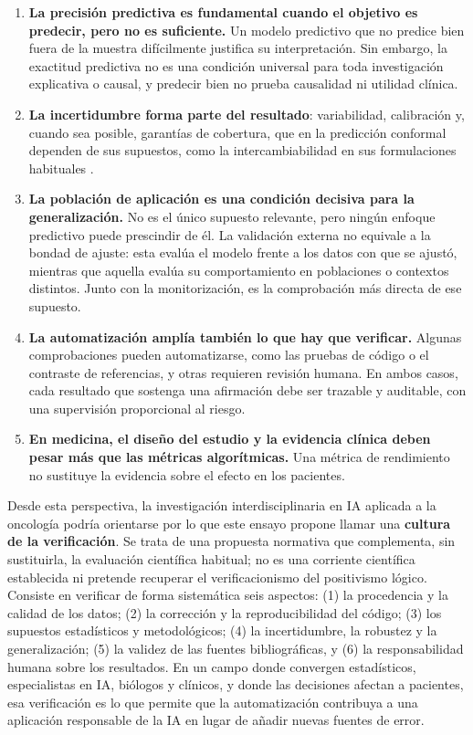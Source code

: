 \documentclass[11pt,a4paper]{article}
\providecommand{\tightlist}{\setlength{\itemsep}{0pt}\setlength{\parskip}{0pt}}
\begin{document}
\begin{enumerate}
\def\labelenumi{\arabic{enumi}.}
\tightlist
\item
  \textbf{La precisión predictiva es fundamental cuando el objetivo es predecir, pero no es suficiente.} Un modelo predictivo que no predice bien fuera de la muestra difícilmente justifica su interpretación. Sin embargo, la exactitud predictiva no es una condición universal para toda investigación explicativa o causal, y predecir bien no prueba causalidad ni utilidad clínica.
\item
  \textbf{La incertidumbre forma parte del resultado}: variabilidad, calibración y, cuando sea posible, garantías de cobertura, que en la predicción conformal dependen de sus supuestos, como la intercambiabilidad en sus formulaciones habituales \autocite{angelopoulos2023}.
\item
  \textbf{La población de aplicación es una condición decisiva para la generalización.} No es el único supuesto relevante, pero ningún enfoque predictivo puede prescindir de él. La validación externa no equivale a la bondad de ajuste: esta evalúa el modelo frente a los datos con que se ajustó, mientras que aquella evalúa su comportamiento en poblaciones o contextos distintos. Junto con la monitorización, es la comprobación más directa de ese supuesto.
\item
  \textbf{La automatización amplía también lo que hay que verificar.} Algunas comprobaciones pueden automatizarse, como las pruebas de código o el contraste de referencias, y otras requieren revisión humana. En ambos casos, cada resultado que sostenga una afirmación debe ser trazable y auditable, con una supervisión proporcional al riesgo.
\item
  \textbf{En medicina, el diseño del estudio y la evidencia clínica deben pesar más que las métricas algorítmicas.} Una métrica de rendimiento no sustituye la evidencia sobre el efecto en los pacientes.
\end{enumerate}

Desde esta perspectiva, la investigación interdisciplinaria en IA aplicada a la oncología podría orientarse por lo que este ensayo propone llamar una \textbf{cultura de la verificación}. Se trata de una propuesta normativa que complementa, sin sustituirla, la evaluación científica habitual; no es una corriente científica establecida ni pretende recuperar el verificacionismo del positivismo lógico. Consiste en verificar de forma sistemática seis aspectos: (1) la procedencia y la calidad de los datos; (2) la corrección y la reproducibilidad del código; (3) los supuestos estadísticos y metodológicos; (4) la incertidumbre, la robustez y la generalización; (5) la validez de las fuentes bibliográficas, y (6) la responsabilidad humana sobre los resultados. En un campo donde convergen estadísticos, especialistas en IA, biólogos y clínicos, y donde las decisiones afectan a pacientes, esa verificación es lo que permite que la automatización contribuya a una aplicación responsable de la IA en lugar de añadir nuevas fuentes de error.
\end{document}
